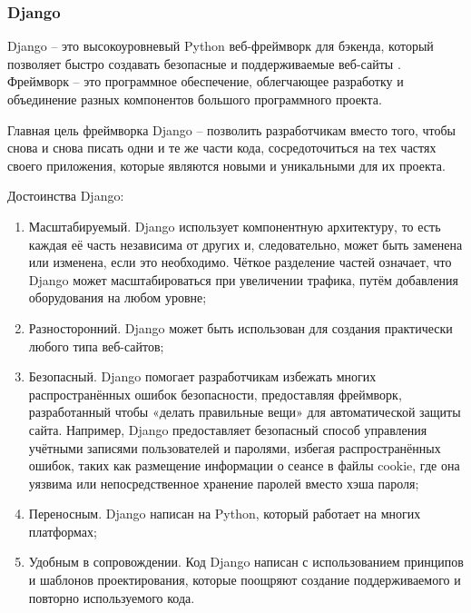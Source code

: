 \def\notedate{2022.10.24}
\def\currentauthor{Василян А.Р. (РК6-73Б)}

\subsubsection{Django}
	
Django -- это высокоуровневый Python веб-фреймворк для бэкенда, который позволяет быстро создавать безопасные и поддерживаемые веб-сайты \cite{Django-intro}. Фреймворк -- это программное обеспечение, облегчающее разработку и объединение разных компонентов большого программного проекта.
	
Главная цель фреймворка Django – позволить разработчикам вместо того, чтобы снова и снова писать одни и те же части кода, сосредоточиться на тех частях своего приложения, которые являются новыми и уникальными для их проекта.
	
Достоинства Django:
\begin{enumerate}
	\item Масштабируемый.  Django использует компонентную архитектуру, то есть каждая её часть независима от других и, следовательно, может быть заменена или изменена, если это необходимо. Чёткое разделение частей означает, что Django может масштабироваться при увеличении трафика, путём добавления оборудования на любом уровне;
	\item Разносторонний. Django может быть использован для создания практически любого типа веб-сайтов;
	\item Безопасный. Django помогает разработчикам избежать многих распространённых ошибок безопасности, предоставляя фреймворк, разработанный чтобы «делать правильные вещи» для автоматической защиты сайта. Например, Django предоставляет безопасный способ управления учётными записями пользователей и паролями, избегая распространённых ошибок, таких как размещение информации о сеансе в файлы cookie, где она уязвима или непосредственное хранение паролей вместо хэша пароля;
	\item Переносным. Django написан на Python, который работает на многих платформах;
	\item Удобным в сопровождении. Код Django написан с использованием принципов и шаблонов проектирования, которые поощряют создание поддерживаемого и повторно используемого кода.
\end{enumerate}

